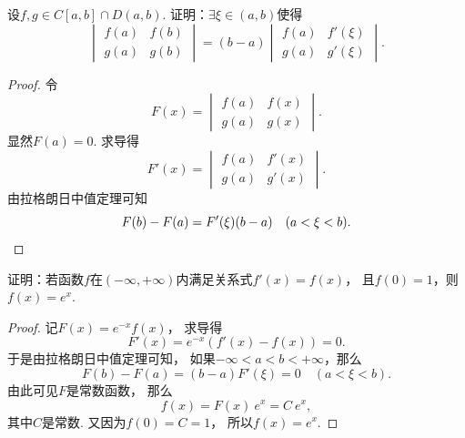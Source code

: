 \begin{example}
设\(f,g \in C[a,b] \cap D(a,b)\).
证明：\(\exists\xi\in(a,b)\)使得\begin{equation*}
	\begin{vmatrix}
		f(a) & f(b) \\
		g(a) & g(b)
	\end{vmatrix}
	= (b-a) \begin{vmatrix}
		f(a) & f'(\xi) \\
		g(a) & g'(\xi)
	\end{vmatrix}.
\end{equation*}
\begin{proof}
令\begin{equation*}
	F(x) = \begin{vmatrix}
		f(a) & f(x) \\
		g(a) & g(x)
	\end{vmatrix}.
\end{equation*}
显然\(F(a) = 0\).
求导得\begin{equation*}
	F'(x) = \begin{vmatrix}
		f(a) & f'(x) \\
		g(a) & g'(x)
	\end{vmatrix}.
\end{equation*}
由拉格朗日中值定理可知\begin{equation*}
	F(b) - F(a) = F'(\xi) (b-a)
	\quad(a<\xi<b).
	\qedhere
\end{equation*}
\end{proof}
\end{example}
\begin{example}
证明：若函数\(f\)在\((-\infty,+\infty)\)内满足关系式\(f'(x) = f(x)\)，
且\(f(0) = 1\)，则\(f(x) = e^x\).
\begin{proof}
记\(F(x) = e^{-x} f(x)\)，
求导得\begin{equation*}
	F'(x) = e^{-x} (f'(x) - f(x))
	= 0.
\end{equation*}
于是由拉格朗日中值定理可知，
如果\(-\infty<a<b<+\infty\)，那么\begin{equation*}
	F(b) - F(a)
	= (b-a) F'(\xi)
	= 0
	\quad(a<\xi<b).
\end{equation*}
由此可见\(F\)是常数函数，
那么\begin{equation*}
	f(x) = F(x)~e^x = C~e^x,
\end{equation*}
其中\(C\)是常数.
又因为\(f(0) = C = 1\)，
所以\(f(x) = e^x\).
\end{proof}
\end{example}

